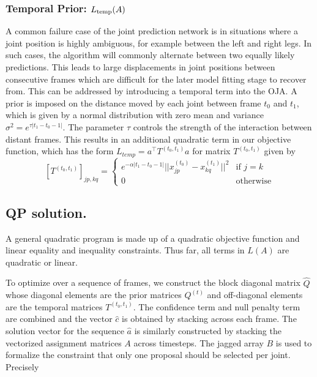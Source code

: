 \subsubsection{Temporal Prior: $L_{\textrm{temp}}(A)$}
A common failure case of the joint prediction network is in situations where a joint position is highly ambiguous, for example between the left and right legs. In such cases, the algorithm will commonly alternate between two equally likely predictions. This leads to large displacements in joint positions between consecutive frames which are difficult for the later model fitting stage to recover from. This can be addressed by introducing a temporal term into the OJA. A prior is imposed on the distance moved by each joint between frame $t_0$ and $t_1$, which is given by a normal distribution with zero mean and variance $\sigma^{2} =e^{\tau|t_1 - t_0 - 1|}$. 
The parameter $\tau$ controls the strength of the interaction between distant frames. This results in an additional quadratic term in our objective function, which has the form $L_{temp} = a^\top T^{(t_0, t_1)} a$ for matrix $T^{(t_0, t_1)}$ given by 
\begin{equation}
\left[T^{(t_0, t_1)}\right]_{jp, kq} = \begin{cases}
e^{-\alpha|t_1 - t_0 - 1|}||x^{(t_0)}_{jp} - x^{(t_1)}_{kq}||^2 & \text{if } j=k\\
0 & \text{otherwise}
\end{cases}
\end{equation}

\subsection{QP solution.}
A general quadratic program is made up of a quadratic objective function and linear equality and inequality constraints. Thus far, all terms in $L(A)$ are quadratic or linear. 

To optimize over a sequence of frames, we construct the block diagonal matrix $\hat{Q}$ whose diagonal elements are the prior matrices $Q^{(t)}$ and off-diagonal elements are the temporal matrices $T^{(t_0, t_1)}$. The confidence term  and null penalty term  are combined and the vector $\hat{c}$ is obtained by stacking across each frame. The solution vector for the sequence $\hat{a}$ is similarly constructed by stacking the vectorized assignment matrices $A$ across timesteps. The jagged array $B$ is used to formalize the constraint that only one proposal should be selected per joint. Precisely

